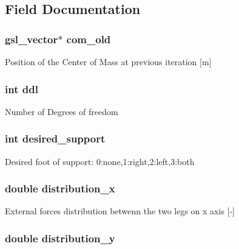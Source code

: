 \subsection{Field Documentation}
\hypertarget{struct_state_a537e2512e9aca2c9b68c41054ad52fa8}{
\subsubsection[{com\-\_\-old}]{\setlength{\rightskip}{0pt plus 5cm}gsl\-\_\-vector$\ast$ com\-\_\-old}}\label{struct_state_a537e2512e9aca2c9b68c41054ad52fa8}
Position of the Center of Mass at previous iteration \mbox{[}m\mbox{]} \hypertarget{struct_state_a6e1faaa1458e3828ba45cde20902bb6d}{
\subsubsection[{ddl}]{\setlength{\rightskip}{0pt plus 5cm}int ddl}}\label{struct_state_a6e1faaa1458e3828ba45cde20902bb6d}
Number of Degrees of freedom \hypertarget{struct_state_a8067647d8a7eea1d16f30f80cea4dec4}{
\subsubsection[{desired\-\_\-support}]{\setlength{\rightskip}{0pt plus 5cm}int desired\-\_\-support}}\label{struct_state_a8067647d8a7eea1d16f30f80cea4dec4}
Desired foot of support\-: 0\-:none,1\-:right,2\-:left,3\-:both \hypertarget{struct_state_a0991a52aa3fa76765202f861a97aca77}{
\subsubsection[{distribution\-\_\-x}]{\setlength{\rightskip}{0pt plus 5cm}double distribution\-\_\-x}}\label{struct_state_a0991a52aa3fa76765202f861a97aca77}
External forces distribution betwenn the two legs on x axis \mbox{[}-\/\mbox{]} \hypertarget{struct_state_a3027c945c3ccd5eef8ef7cc5a730c231}{
\subsubsection[{distribution\-\_\-y}]{\setlength{\rightskip}{0pt plus 5cm}double distribution\-\_\-y}}\label{struct_state_a3027c945c3ccd5eef8ef7cc5a730c231}
